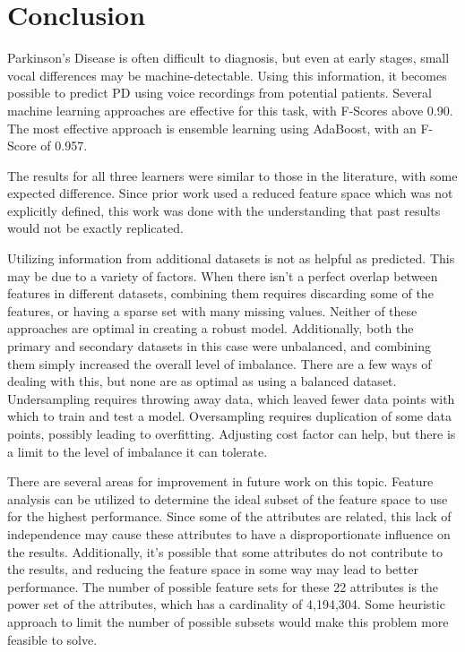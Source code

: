 \documentclass[draftcopy]{srpaper}
\begin{document}
\chapter{Conclusion}
\label{Chapter:Five}
Parkinson's Disease is often difficult to
diagnosis, but even at early stages, small vocal differences may be machine-detectable. Using this information, it becomes possible to predict PD
using voice recordings from potential patients. Several machine
learning approaches are effective for this task, with F-Scores above
0.90. The most effective approach is ensemble learning using
AdaBoost, with an F-Score of 0.957. 

The results for all three learners
were similar to those in the literature, with some expected
difference. Since prior work used a reduced feature space which was
not explicitly defined, this work was done with the understanding that
past results would not be exactly replicated. 

Utilizing information from additional datasets is not as helpful as
predicted. This may be due to a variety of factors. When there isn't a
perfect overlap between features in different datasets, combining them
requires discarding some of the features, or having a sparse set with
many missing values. Neither of these approaches are optimal in
creating a robust model. Additionally, both the primary and secondary
datasets in this case were unbalanced, and combining them simply
increased the overall level of imbalance. There are a few ways of dealing
with this, but none are as optimal as using a balanced dataset. Undersampling requires throwing
away data, which leaved fewer data points with which to train and test
a model. Oversampling requires
duplication of some
data points, possibly leading to overfitting. Adjusting cost factor can
help, but there is a limit to the level of imbalance it can tolerate.

There are several areas for improvement in future work on this
topic. Feature analysis can be utilized to determine the ideal subset
of the feature space to use for the highest performance. Since some of
the attributes are related, this lack of independence may cause these
attributes to have a disproportionate influence on the
results. Additionally, it's possible that some attributes do not
contribute to the results, and reducing the feature space in some way
may lead to better performance. The number of possible feature sets
for these 22 attributes is the power set of the attributes, which has
a cardinality of 4,194,304. Some heuristic approach to limit the
number of possible subsets would make this problem more feasible to
solve. 
\end{document}
